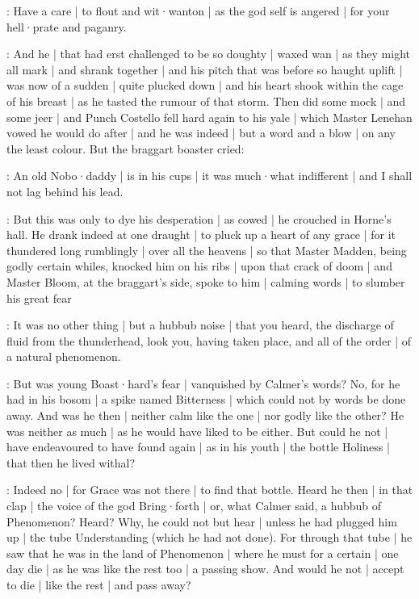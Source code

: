 \lynch:
Have a care |
to flout and wit·wanton |
as the god self is angered |
for your hell·prate and paganry.

:
And he |
that had erst challenged to be so doughty |
waxed wan |
as they might all mark |
and shrank together |
and his pitch that was before so haught uplift |
was now of a sudden |
quite plucked down |
and his heart shook within the cage of his breast |
as he tasted the rumour of that storm.
Then did some mock |
and some jeer |
and Punch Costello fell hard again to his yale |
which Master Lenehan vowed he would do after |
and he was indeed |
but a word and a blow |
on any the least colour.
But the braggart boaster cried:

\stephen:
An old Nobo·daddy |
is in his cups |
it was much·what indifferent |
and I shall not lag behind his lead.

:
But this was only to dye his desperation |
as cowed |
he crouched in Horne's hall.
He drank indeed at one draught |
to pluck up a heart of any grace |
for it thundered long rumblingly |
over all the heavens |
so that Master Madden,
being godly certain whiles,
knocked him on his ribs |
upon that crack of doom |
and Master Bloom,
at the braggart's side,
spoke to him |
calming words |
to slumber his great fear

\Bloom:
It was no other thing |
but a hubbub noise |
that you heard,
the discharge of fluid from the thunderhead,
look you,
having taken place,
and all of the order |
of a natural phenomenon.



:
But was young Boast·hard's fear |
vanquished by Calmer's words?
No,
for he had in his bosom |
a spike named Bitterness |
which could not by words be done away.
And was he then |
neither calm like the one |
nor godly like the other?
He was neither as much |
as he would have liked to be either.
But could he not |
have endeavoured to have found again |
as in his youth |
the bottle Holiness |
that then he lived withal?

:
Indeed no |
for Grace was not there |
to find that bottle.
Heard he then |
in that clap |
the voice of the god Bring·forth |
or,
what Calmer said,
a hubbub of Phenomenon?
Heard?
Why,
he could not but hear |
unless he had plugged him up |
the tube Understanding
(which he had not done).
For through that tube |
he saw that he was in the land of Phenomenon |
where he must for a certain |
one day die |
as he was like the rest too |
a passing show.
And would he not |
accept to die |
like the rest |
and pass away?

